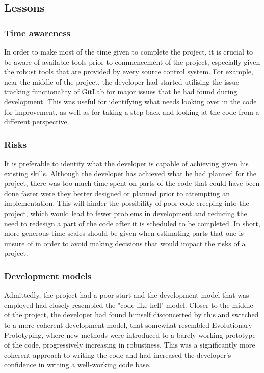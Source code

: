 \documentclass[12pt,a4paper,tightenlines]{article}
\begin{document}
\subsection{Lessons}
\subsubsection{Time awareness}
In order to make most of the time given to complete the project, it is crucial
to be aware of available tools prior to commencement of the project, especially
given the robust tools that are provided by every source control system. For example,
near the middle of the project, the developer had started utilising the issue tracking
functionality of GitLab for major issues that he had found during development. This
was useful for identifying what needs looking over in the code for improvement, as
well as for taking a step back and looking at the code from a different perspective.

\subsubsection{Risks}
It is preferable to identify what the developer is capable of achieving given his
existing skills. Although the developer has achieved what he had planned for the
project, there was too much time spent on parts of the code that could have been
done faster were they better designed or planned prior to attempting an implementation.
This will hinder the possibility of poor code creeping into the project, which would
lead to fewer problems in development and reducing the need to redesign a part of the
code after it is scheduled to be completed. In short, more generous time scales should
be given when estimating parts that one is unsure of in order to avoid making decisions
that would impact the risks of a project.

\subsubsection{Development models}
Admittedly, the project had a poor start and the development model that was employed
had closely resembled the "code-like-hell" model. Closer to the middle of the project,
the developer had found himself disconcerted by this and switched to a more coherent
development model, that somewhat resembled Evolutionary Prototyping, where new methods
were introduced to a barely working prototype of the code, progressively increasing in
robustness. This was a significantly more coherent approach to writing the code and 
had increased the developer's confidence in writing a well-working code base.
\end{document}
